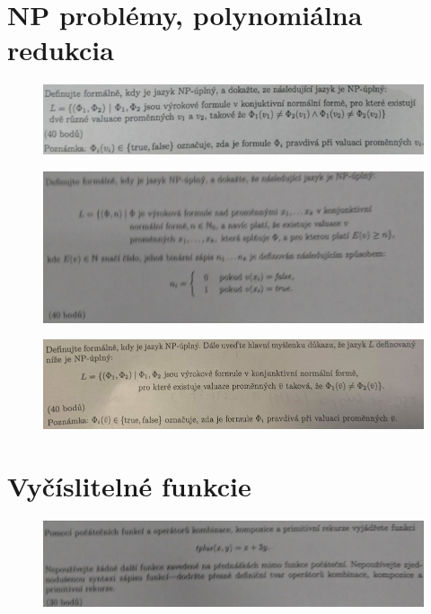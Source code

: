 \documentclass[]{article}
\begin{document}
	\section{NP problémy, polynomiálna redukcia}
	
	\begin{figure}[H]
		\includegraphics[width=\textwidth]{tasks/np/task1.png}
	\end{figure}

	\begin{figure}[H]
		\includegraphics[width=\textwidth]{tasks/np/task2.png}
	\end{figure}
	
	\begin{figure}[H]
		\includegraphics[width=\textwidth]{tasks/np/task3.png}
	\end{figure}

	\section{Vyčíslitelné funkcie}

	\begin{figure}[H]
		\includegraphics[width=\textwidth]{tasks/funkcie/task1.png}
	\end{figure}
\end{document}
